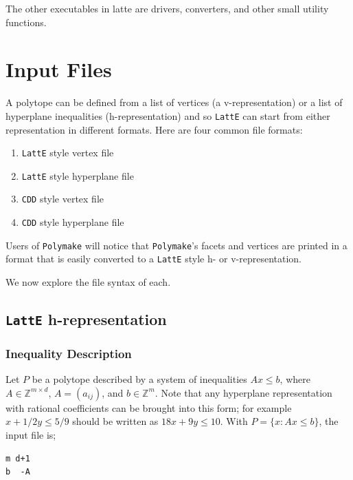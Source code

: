 \documentclass{article}
\newcommand{\Z}{{\mathbb Z}}
\newcommand{\latte}{{\tt LattE}\xspace}
\newcommand{\cdd}{{\tt CDD}\xspace}
\begin{document}
The other executables in latte are drivers, converters, and other small utility functions.


\section{Input Files}\label{Input Files}

A polytope can be defined from a list of vertices (a v-representation) or a list of hyperplane inequalities (h-representation) and so \latte can start from either representation in different formats. Here are four common file formats:
\begin{enumerate}
        \item \latte style vertex file
        \item \latte style hyperplane file
        \item \cdd style vertex file
        \item \cdd style hyperplane file
\end{enumerate}

Users of {\tt Polymake} will notice that {\tt Polymake}'s facets and vertices are printed in a format that is easily converted to a \latte style h- or v-representation.

We now explore the file syntax of each.

\subsection{\latte h-representation}

\subsubsection{Inequality Description}
Let $P$ be a polytope described by a
system of inequalities $Ax\leq b$, where $A\in\Z^{m\times d}$, 
$A=(a_{ij})$, and $b\in\Z^m$. Note that any hyperplane representation with rational coefficients can be brought into this form; for example $x + 1/2y \leq 5/9$ should be written as $18x +9y \leq 10$. With $P=\{x : Ax \leq b\}$, the input file is;
\begin{verbatim}
m d+1
b  -A
\end{verbatim}
\end{document}
